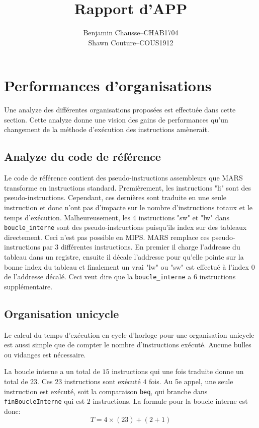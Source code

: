 \documentclass[a11paper]{article}
\title{Rapport d'APP}
\author{
  \addtolength{\tabcolsep}{-0.4em}
  \begin{tabular}{rcl} %
      Benjamin Chausse & -- & CHAB1704 \\
      Shawn Couture    & -- & COUS1912 \\
  \end{tabular}
}
\newcommand{\todo}[1]{\begin{color}{Red}\textbf{TODO:} #1\end{color}}
\begin{document}
\maketitle
\newpage
\tableofcontents
\newpage

\section{Performances d'organisations}
Une analyze des différentes organisations proposées est effectuée dans cette section. Cette analyze donne une vision des gains de performances qu'un changement de la méthode
d'exécution des instructions amènerait.

\subsection{Analyze du code de référence}
Le code de référence contient des pseudo-instructions assembleurs que MARS transforme en instructions standard. Premièrement, les instructions "li" sont des pseudo-instructions.
Cependant, ces dernières sont traduite en une seule instruction et donc n'ont pas d'impacte sur le nombre d'instructions totaux et le temps d'exécution.
Malheureusement, les 4 instructions "sw" et "lw" dans \verb|boucle_interne| sont des pseudo-instructions puisqu'ils index sur des tableaux directement. Ceci n'est pas possible en
MIPS. MARS remplace ces pseudo-instructions par 3 différentes instructions. En premier il charge l'addresse du tableau dans un registre, ensuite il décale l'addresse pour qu'elle
pointe sur la bonne index du tableau et finalement un vrai "lw" ou "sw" est effectué à l'index 0 de l'addresse décalé. Ceci veut dire que la \verb|boucle_interne| a 6 instructions
supplémentaire.

\subsection{Organisation unicycle}
Le calcul du temps d'exécution en cycle d'horloge pour une organisation unicycle est aussi simple que de compter le nombre d'instructions exécuté. Aucune bulles ou vidanges est 
nécessaire. 

La boucle interne a un total de $15$ instructions qui une fois traduite donne un total de $23$. Ces 23 instructions sont exécuté $4$ fois. Au 5e appel, une seule instruction est
exécuté, soit la comparaison \verb|beq|, qui branche dans \verb|finBoucleInterne| qui est $2$ instructions. La formule pour la boucle interne est donc:
$$
T = 4\times(23)+(2+1)
$$
\end{document}
